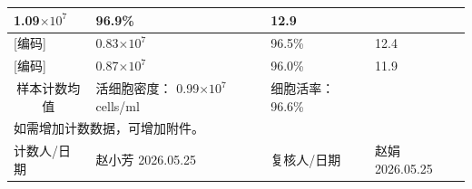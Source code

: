 \documentclass[UTF8,10pt,a4paper,fontset=fandol]{ctexart}
\newcommand{\fieldvalue}[1]{#1}
\newcommand{\handwritten}[1]{#1}
\begin{document}
\begin{tabularx}{\textwidth}{|p{4.0cm}|X|p{3.0cm}|X|}
\fieldvalue{\handwritten{1.09}}$\times10^7$ &
\fieldvalue{\handwritten{96.9}}\% &
\fieldvalue{\handwritten{12.9}}\\
\hline
\fieldvalue{\handwritten{[编码]}} &
\fieldvalue{\handwritten{0.83}}$\times10^7$ &
\fieldvalue{\handwritten{96.5}}\% &
\fieldvalue{\handwritten{12.4}}\\
\hline
\fieldvalue{\handwritten{[编码]}} &
\fieldvalue{\handwritten{0.87}}$\times10^7$ &
\fieldvalue{\handwritten{96.0}}\% &
\fieldvalue{\handwritten{11.9}}\\
\hline
\multicolumn{1}{|c|}{样本计数均值} &
活细胞密度：
\fieldvalue{\handwritten{0.99}}$\times10^7$ cells/ml &
细胞活率：
\fieldvalue{\handwritten{96.6}}\% &
\\
\hline
\multicolumn{4}{|l|}{如需增加计数数据，可增加附件。}\\
\hline
计数人/日期 &
\fieldvalue{\handwritten{赵小芳}} \quad
\fieldvalue{\handwritten{2026.05.25}} &
复核人/日期 &
\fieldvalue{\handwritten{赵娟}} \quad
\fieldvalue{\handwritten{2026.05.25}}\\
\hline
\end{tabularx}
\end{document}
